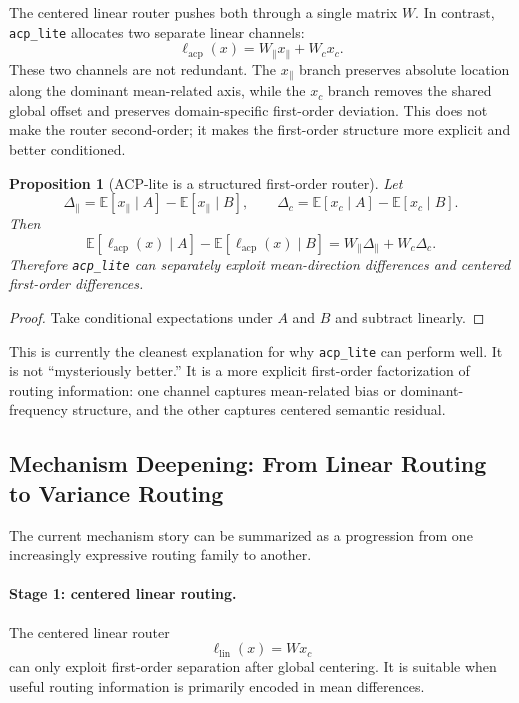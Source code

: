 \documentclass[11pt]{article}
\newtheorem{proposition}{Proposition}
\begin{document}
The centered linear router pushes both through a single matrix $W$. In contrast, \texttt{acp\_lite} allocates two separate linear channels:
\[
\ell_{\mathrm{acp}}(x)=W_{\parallel}x_{\parallel}+W_c x_c.
\]
These two channels are not redundant. The $x_{\parallel}$ branch preserves absolute location along the dominant mean-related axis, while the $x_c$ branch removes the shared global offset and preserves domain-specific first-order deviation. This does not make the router second-order; it makes the first-order structure more explicit and better conditioned.

\begin{proposition}[ACP-lite is a structured first-order router]
Let
\[
\Delta_{\parallel}
=
\mathbb{E}[x_{\parallel}\mid A]-\mathbb{E}[x_{\parallel}\mid B],
\qquad
\Delta_c
=
\mathbb{E}[x_c\mid A]-\mathbb{E}[x_c\mid B].
\]
Then
\[
\mathbb{E}[\ell_{\mathrm{acp}}(x)\mid A]-\mathbb{E}[\ell_{\mathrm{acp}}(x)\mid B]
=
W_{\parallel}\Delta_{\parallel}+W_c\Delta_c.
\]
Therefore \texttt{acp\_lite} can separately exploit mean-direction differences and centered first-order differences.
\end{proposition}

\begin{proof}
Take conditional expectations under $A$ and $B$ and subtract linearly.
\end{proof}

This is currently the cleanest explanation for why \texttt{acp\_lite} can perform well. It is not ``mysteriously better.'' It is a more explicit first-order factorization of routing information: one channel captures mean-related bias or dominant-frequency structure, and the other captures centered semantic residual.

\subsection{Mechanism Deepening: From Linear Routing to Variance Routing}

The current mechanism story can be summarized as a progression from one increasingly expressive routing family to another.

\paragraph{Stage 1: centered linear routing.}
The centered linear router
\[
\ell_{\mathrm{lin}}(x)=W x_c
\]
can only exploit first-order separation after global centering. It is suitable when useful routing information is primarily encoded in mean differences.
\end{document}
